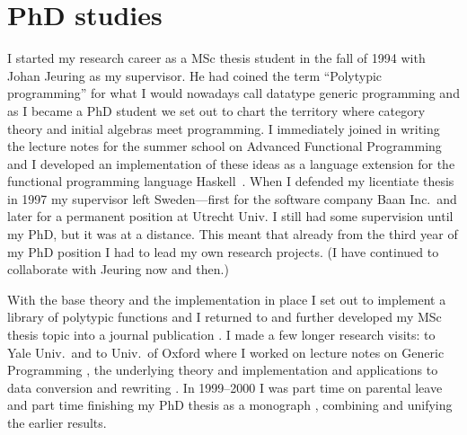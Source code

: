 \section{PhD studies}
I started my research career as a MSc thesis student in the fall of
1994 with Johan Jeuring as my supervisor.
%
He had coined the term ``Polytypic programming'' for what I would
nowadays call datatype generic programming and as I became a PhD
student we set out to chart the territory where category theory and
initial algebras meet programming.
%
I immediately joined in writing the lecture notes for the summer
school on Advanced Functional Programming \citep{jeuringjansson-afp}
and I developed an implementation of these ideas as a language
extension for the functional programming language Haskell~\citep{janssonjeuring1997a}.
%
When I defended my licentiate thesis \citep{jansson97a} in 1997 my supervisor
left Sweden---first for the software company Baan Inc.\ and later for a
permanent position at Utrecht Univ.
%
I still had some supervision until my PhD, but it was at a distance.
%
This meant that already from the third year of my PhD position I had
to lead my own research projects.
%
(I have continued to collaborate with Jeuring now and then.)


With the base theory and the implementation in place I set out to
implement a library of polytypic functions
\citep{janssonjeuring-polylib} and I returned to and further developed
my MSc thesis topic into a journal publication
\citep{janssonjeuring-polyunify}.
%
I made a few longer research visits: to Yale Univ.\ and to Univ.\ of Oxford
 where I worked on lecture notes on Generic Programming
\citep{backhouseetal98}, the underlying theory and implementation
\citep{jansson:PolyP2compiler} and applications to data conversion
\citep{janssonjeuringdc} and rewriting
\citep{janssonjeuringWGP00:rewriting}.
%
In 1999--2000 I was part time on parental leave and part time
finishing my PhD thesis as a monograph \citep{jansson-phdthesis}, combining
and unifying the earlier results.

